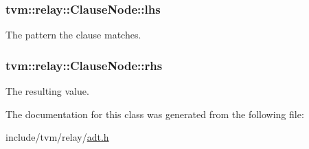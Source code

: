 \subsubsection[{\texorpdfstring{lhs}{lhs}}]{ tvm\+::relay\+::\+Clause\+Node\+::lhs}\hypertarget{classtvm_1_1relay_1_1ClauseNode_a85479b56eab2bb3255248a8b0fcd23f8}{}\label{classtvm_1_1relay_1_1ClauseNode_a85479b56eab2bb3255248a8b0fcd23f8}


The pattern the clause matches. 

\subsubsection[{\texorpdfstring{rhs}{rhs}}]{ tvm\+::relay\+::\+Clause\+Node\+::rhs}\hypertarget{classtvm_1_1relay_1_1ClauseNode_a93217eeea15c1f7c1a659da3da86d3bd}{}\label{classtvm_1_1relay_1_1ClauseNode_a93217eeea15c1f7c1a659da3da86d3bd}


The resulting value. 



The documentation for this class was generated from the following file\+:\begin{DoxyCompactItemize}
\item 
include/tvm/relay/\hyperlink{relay_2adt_8h}{adt.\+h}\end{DoxyCompactItemize}
